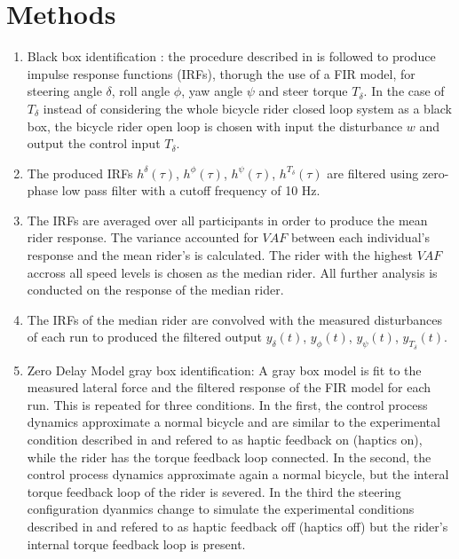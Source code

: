 \section{Methods}
\begin{enumerate}
    \item Black box identification : the procedure described in \cite{dialynaseffect} is followed to produce impulse response functions (IRFs), thorugh the use of a FIR model, for steering angle \ensuremath{\delta}, roll angle \ensuremath{\phi}, yaw angle \ensuremath{\psi} and steer torque  \ensuremath{T_\delta}. In the case of \ensuremath{T_\delta} instead of considering the whole bicycle rider closed loop system as a black box, the bicycle rider open loop is chosen with input the disturbance \ensuremath{w} and output the control input \ensuremath{T_\delta}.
    \item The produced IRFs \ensuremath{h^\delta(\tau)}, \ensuremath{h^\phi(\tau)}, \ensuremath{h^\psi(\tau)}, \ensuremath{h^{T_\delta}(\tau)} are filtered using zero-phase low pass filter with a cutoff frequency of 10 \si{\hertz}.
    \item The IRFs are averaged over all participants in order to produce the mean rider response. The variance accounted for \ensuremath{\mathit{VAF}} between each individual's  response and the mean rider's is calculated. The rider with the highest  \ensuremath{\mathit{VAF}}  accross all speed levels  is chosen as the median rider. All further analysis is conducted on the response of the median rider.
    \item The IRFs of the median rider are convolved with the measured disturbances of each run to produced the filtered output \ensuremath{y_\delta(t)}, \ensuremath{y_\phi(t)}, \ensuremath{y_\psi(t)}, \ensuremath{y_{T_\delta}(t)}.
    \item Zero Delay Model gray box identification: A gray box model  is fit to the measured lateral
    force and the filtered response of the FIR
    model for each run. This is repeated for three conditions. In the first, the control process dynamics approximate a normal bicycle and are similar to the experimental condition described in \cite{dialynaseffect} and refered to as haptic feedback on (haptics on), while  the rider has the torque feedback loop connected. In the second, the control process dynamics approximate again a normal bicycle, but the interal torque feedback loop of the rider is severed. In the third the steering configuration dyanmics change to simulate the experimental conditions described in \cite{dialynaseffect} and refered to as haptic feedback off (haptics off) but the rider's internal torque feedback loop is present.

\end{enumerate}
